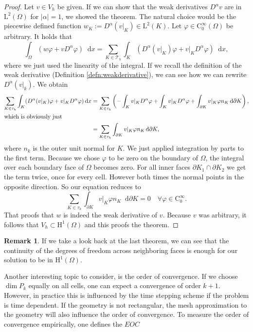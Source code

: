 \documentclass[12pt,a4paper,twoside, open=right]{scrreprt}
\theoremstyle{definition}
\newtheorem{rem}[auf]{Remark}
\theoremstyle{plain}
\newcommand{\abs}[1]{\left\vert #1\right\vert}
\newcommand{\D}{\mathop{}\!\mathrm{d}}
\begin{document}
\begin{proof}
    Let $v\in V_h$ be given. If we can show that the weak derivatives $D^\alpha v$ are in $ \mathrm{L}^2(\Omega)$ for $\abs{\alpha}=1$, we showed the theorem. The natural choice would be the piecewise defined function $w_K:=D^\alpha(v\vert_K)\in \mathrm{L}^2(K)$. Let $\varphi\in \mathrm{C}^\infty_0(\Omega)$ be arbitrary. It holds that 
    \begin{equation}
        \int_\Omega(w\varphi+vD^\alpha \varphi)\D x = \sum_{K\in\mathcal{T}_h}\int_K(D^\alpha(v\vert_K)\varphi+v\vert_K D^\alpha\varphi)\D x,
    \end{equation}
    where we just used the linearity of the integral. If we recall the definition of the weak derivative (Definition \ref{defn:weakderivative}), we can see how we can rewrite $D^\alpha(v\vert_k)$. We obtain
    \begin{align}
        \sum_{K\in\tau_h}\int_K(D^\alpha(v\vert_K)\varphi+v\vert_K D^\alpha\varphi)\D x&=\sum_{K\in\tau_h}\left(-\int_K v\vert_KD^\alpha\varphi+\int_K v\vert_K D^\alpha\varphi +\int_{\partial K}v\vert_K\varphi n_K\D\partial K\right),\\\intertext{which is obviously just}& =\sum_{K\in\tau_h}\int_{\partial K}v\vert_K\varphi n_K\D\partial K,
    \end{align}
    where $n_k$ is the outer unit normal for $K$. We just applied integration by parts to the first term. Because we chose $\varphi$ to be zero on the boundary of $\Omega$, the integral over each boundary face of $\Omega$ becomes zero. For all inner faces $\partial K_1\cap \partial K_2$ we get the term twice, once for every cell. However both times the normal points in the opposite direction. So our equation reduces to 
    \begin{equation}
        \sum_{K\in\tau_h}\int_{\partial K}v\vert_K\varphi n_K\D\partial K=0 \quad \forall\varphi\in \mathrm{C}^\infty_0.
    \end{equation}
    That proofs that $w$ is indeed the weak derivative of $v$. Because $v$ was arbitrary, it follows that $V_h\subset \mathrm{H}^1(\Omega)$ and this proofs the theorem.
\end{proof}
\begin{rem}
    If we take a look back at the last theorem, we can see that the continuity of the degrees of freedom across neighboring faces is enough for our solution to be in $\mathrm{H}^1(\Omega)$. 
\end{rem}
Another interesting topic to consider, is the order of convergence. If we choose $\dim P_k$ equally on all cells, one can expect a convergence of order $k+1$. However, in practice this is influenced by the time stepping scheme if the problem is time dependent. If the geometry is not rectangular, the mesh approximation to the geometry will also influence the order of convergence. To measure the order of convergence empirically, one defines the $EOC$
\end{document}

